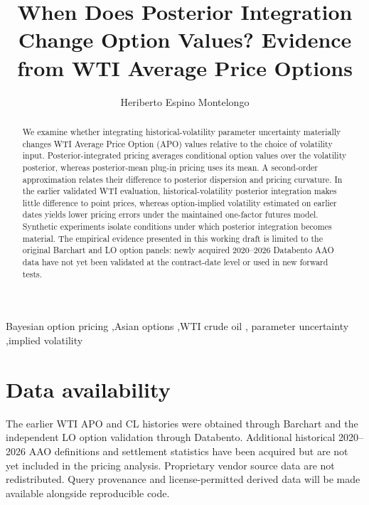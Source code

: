 \documentclass[a4paper,fleqn]{cas-dc}
\begin{document}
\let\WriteBookmarks\relax
{}
\title[mode=title]{When Does Posterior Integration Change Option Values? Evidence from WTI Average Price Options}
\author[1]{Heriberto Espino Montelongo}
\cormark[1]

\begin{abstract}
We examine whether integrating historical-volatility parameter uncertainty materially changes WTI Average Price Option (APO) values relative to the choice of volatility input. Posterior-integrated pricing averages conditional option values over the volatility posterior, whereas posterior-mean plug-in pricing uses its mean. A second-order approximation relates their difference to posterior dispersion and pricing curvature. In the earlier validated WTI evaluation, historical-volatility posterior integration makes little difference to point prices, whereas option-implied volatility estimated on earlier dates yields lower pricing errors under the maintained one-factor futures model. Synthetic experiments isolate conditions under which posterior integration becomes material. The empirical evidence presented in this working draft is limited to the original Barchart and LO option panels: newly acquired 2020--2026 Databento AAO data have not yet been validated at the contract-date level or used in new forward tests.
\end{abstract}

\begin{keywords}
Bayesian option pricing \sep Asian options \sep WTI crude oil \sep
parameter uncertainty \sep implied volatility
\end{keywords}
\maketitle








\section*{Data availability}
The earlier WTI APO and CL histories were obtained through Barchart and the
independent LO option validation through Databento. Additional historical
2020--2026 AAO definitions and settlement statistics have been acquired but
are not yet included in the pricing analysis. Proprietary vendor source data
are not redistributed. Query provenance and license-permitted derived data
will be made available alongside reproducible code.
\end{document}

